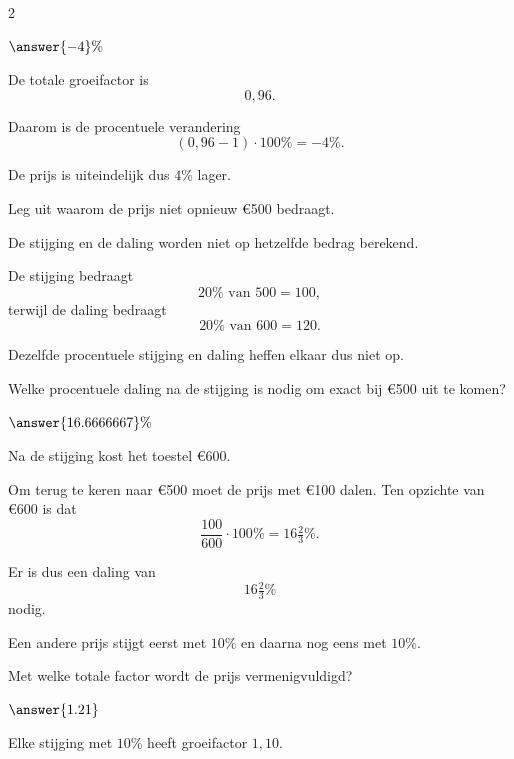 \documentclass{ximera}
\begin{document}
\begin{oefening}{\oefU\ESS}
\begin{multicols}{2}
\begin{question}
    $\answer{-4}\%$
    
    \begin{oplossing}
    De totale groeifactor is
    \[
    0{,}96.
    \]
    
    Daarom is de procentuele verandering
    \[
    (0{,}96-1)\cdot100\%
    =-4\%.
    \]
    
    De prijs is uiteindelijk dus $4\%$ lager.
    \end{oplossing}
    \end{question}
    
    
    \begin{question}
    Leg uit waarom de prijs niet opnieuw €500 bedraagt.
    
    \begin{oplossing}
    De stijging en de daling worden niet op hetzelfde bedrag berekend.
    
    De stijging bedraagt
    \[
    20\%\text{ van }500=100,
    \]
    terwijl de daling bedraagt
    \[
    20\%\text{ van }600=120.
    \]
    
    Dezelfde procentuele stijging en daling heffen elkaar dus niet op.
    \end{oplossing}
    \end{question}
    
    
    \begin{question}
    Welke procentuele daling na de stijging is nodig om exact bij €500 uit te komen?
    
    $\answer{16.6666667}\%$
    
    \begin{oplossing}
    Na de stijging kost het toestel €600.
    
    Om terug te keren naar €500 moet de prijs met €100 dalen. Ten opzichte van €600 is dat
    \[
    \dfrac{100}{600}\cdot100\%
    =16\tfrac23\%.
    \]
    
    Er is dus een daling van
    \[
    16\tfrac23\%
    \]
    nodig.
    \end{oplossing}
    \end{question}
    
    
    \begin{question}
    Een andere prijs stijgt eerst met $10\%$ en daarna nog eens met $10\%$.
    
    Met welke totale factor wordt de prijs vermenigvuldigd?
    
    $\answer{1.21}$
    
    \begin{oplossing}
    Elke stijging met $10\%$ heeft groeifactor $1{,}10$.
    

\end{oplossing}
\end{question}
\end{multicols}
\end{oefening}
\end{document}
